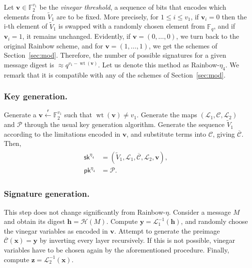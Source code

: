\documentclass[12pt, a4paper, oneside]{memoir}
\DeclareMathOperator*{\wt}{wt}
\newcommand{\random}{\overset{\mathsf{r}}{\gets}}
\theoremstyle{definition}
\begin{document}
Let $\mathbf{v} \in \mathbb{F}_{2}^{v_{1}}$ be the \emph{vinegar threshold}, a sequence of bits that encodes which elements from $\widetilde{V}_{1}$ are to be fixed. More precisely, for $1 \leq i \leq v_{1}$, if $\mathbf{v}_{i} = 0$ then the i-th element of $\widetilde{V}_{1}$ is swapped with a randomly chosen element from $\mathbb{F}_{q}$, and if $\mathbf{v}_{i} = 1$, it remains unchanged. Evidently, if $\mathbf{v} = (0, \dots, 0)$, we turn back to the original Rainbow scheme, and for $\mathbf{v} = (1, \dots, 1)$, we get the schemes of Section~\ref{sec:mod}. Therefore, the number of possible signatures for a given message digest is $\approx q^{v_{1} - \wt(\mathbf{v})}$. Let us denote this method as Rainbow-$\eta_{4}$. We remark that it is compatible with any of the schemes of Section~\ref{sec:mod}.

\subsubsection{Key generation.}

Generate a $\mathbf{v} \random{} \mathbb{F}_{2}^{v_{1}}$ such that $\wt(\mathbf{v}) \neq v_{1}$. Generate the maps $(\mathcal{L}_{1}, \mathcal{C}, \mathcal{L}_{2})$ and $\mathcal{P}$ through the usual key generation algorithm. Generate the sequence $\widetilde{V}_{1}$ according to the limitations encoded in $\mathbf{v}$, and substitute terms into $\mathcal{C}$, giving $\overline{\mathcal{C}}$. Then,
\begin{align}
  \begin{split}
    \mathsf{sk}^{\eta_{4}} &= (\widetilde{V}_{1}, \mathcal{L}_{1}, \overline{\mathcal{C}}, \mathcal{L}_{2}, \mathbf{v}), \\
    \mathsf{pk}^{\eta_{4}} &= \mathcal{P}.
  \end{split}
\end{align}

\subsubsection{Signature generation.}

This step does not change significantly from Rainbow-$\eta$. Consider a message $M$ and obtain its digest $\mathbf{h} = \mathcal{H}(M)$. Compute $\mathbf{y} = \mathcal{L}_{1}^{-1}(\mathbf{h})$, and randomly choose the vinegar variables as encoded in $\mathbf{v}$. Attempt to generate the preimage $\overline{\mathcal{C}}(\mathbf{x}) = \mathbf{y}$ by inverting every layer recursively. If this is not possible, vinegar variables have to be chosen again by the aforementioned procedure. Finally, compute $\mathbf{z} = \mathcal{L}_{2}^{-1}(\mathbf{x})$.
\end{document}
